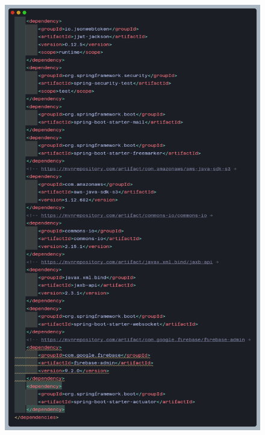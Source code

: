 \begin{figure}[H]
    \centering
    \includegraphics[width=.8\textwidth]{resources/images/dependencias-anexo-2}\label{fig:dependencias Api 2}
\end{figure}